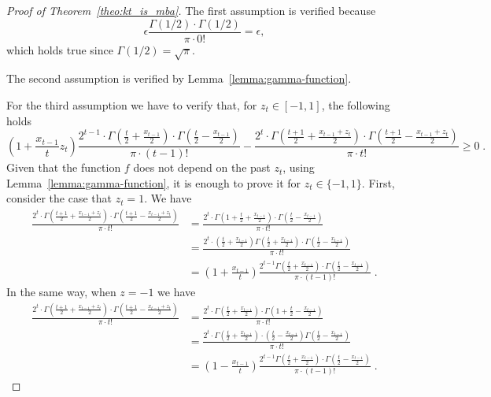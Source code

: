 \begin{proof}[Proof of Theorem~\ref{theo:kt_is_mba}]
The first assumption is verified because
\[
\epsilon \frac{\Gamma(1/2) \cdot \Gamma(1/2)}{\pi \cdot 0!} = \epsilon ,
\]
which holds true since $\Gamma(1/2) = \sqrt{\pi}$.

The second assumption is verified by Lemma~\ref{lemma:gamma-function}.

For the third assumption we have to verify that, for $z_t \in [-1,1]$, the following holds
\[
(1+\frac{x_{t-1}}{t} z_t) \frac{2^{t-1} \cdot \Gamma \left(\frac{t}{2} + \frac{x_{t-1}}{2} \right) \cdot \Gamma \left(\frac{t}{2} - \frac{x_{t-1}}{2} \right)}{\pi \cdot (t-1)!}
- \frac{2^t \cdot \Gamma \left(\frac{t+1}{2} + \frac{x_{t-1}+z_t}{2} \right) \cdot \Gamma \left(\frac{t+1}{2} - \frac{x_{t-1}+z_t}{2} \right)}{\pi \cdot t!} \geq 0\;.
\]
Given that the function $f$ does not depend on the past $z_t$, using Lemma~\ref{lemma:gamma-function}, it is enough to prove it for $z_t \in \{-1,1\}$.
First, consider the case that $z_t=1$. We have
\begin{align*}
\frac{2^t \cdot \Gamma \left(\frac{t+1}{2} + \frac{x_{t-1}+z_t}{2} \right) \cdot \Gamma \left(\frac{t+1}{2} - \frac{x_{t-1}+z_t}{2} \right)}{\pi \cdot t!}
&= \frac{2^t \cdot \Gamma \left(1+\frac{t}{2} + \frac{x_{t-1}}{2} \right) \cdot \Gamma \left(\frac{t}{2} - \frac{x_{t-1}}{2} \right)}{\pi \cdot t!} \\
&= \frac{2^t \cdot \left(\frac{t}{2} + \frac{x_{t-1}}{2} \right) \Gamma \left(\frac{t}{2} + \frac{x_{t-1}}{2} \right) \cdot \Gamma \left(\frac{t}{2} - \frac{x_{t-1}}{2} \right)}{\pi \cdot t!} \\
&= \left(1 + \frac{x_{t-1}}{t} \right) \frac{2^{t-1} \Gamma \left(\frac{t}{2} + \frac{x_{t-1}}{2} \right) \cdot \Gamma \left(\frac{t}{2} - \frac{x_{t-1}}{2} \right)}{\pi \cdot (t-1)!} \; .
\end{align*}
In the same way, when $z=-1$ we have
\begin{align*}
\frac{2^t \cdot \Gamma \left(\frac{t+1}{2} + \frac{x_{t-1}+z_t}{2} \right) \cdot \Gamma \left(\frac{t+1}{2} - \frac{x_{t-1}+z_t}{2} \right)}{\pi \cdot t!}
&= \frac{2^t \cdot \Gamma \left(\frac{t}{2} + \frac{x_{t-1}}{2} \right) \cdot \Gamma \left(1+\frac{t}{2} - \frac{x_{t-1}}{2} \right)}{\pi \cdot t!} \\
&= \frac{2^t \cdot \Gamma \left(\frac{t}{2} + \frac{x_{t-1}}{2} \right) \cdot \left(\frac{t}{2} - \frac{x_{t-1}}{2} \right) \Gamma \left(\frac{t}{2} - \frac{x_{t-1}}{2} \right)}{\pi \cdot t!} \\
&= \left(1 - \frac{x_{t-1}}{t} \right) \frac{2^{t-1} \Gamma \left(\frac{t}{2} + \frac{x_{t-1}}{2} \right) \cdot \Gamma \left(\frac{t}{2} - \frac{x_{t-1}}{2} \right)}{\pi \cdot (t-1)!} \; .
\end{align*}
\end{proof}



